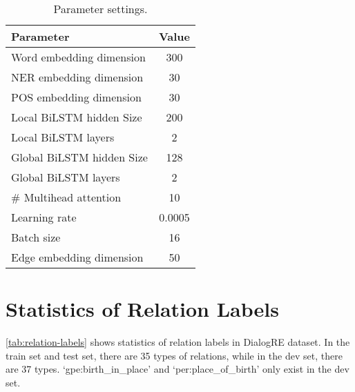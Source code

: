 \documentclass[11pt]{article}
\begin{document}
\begin{table}[ht]
\centering
\begin{tabular}{l|c}
\toprule
 Parameter & Value \\
\midrule
Word embedding dimension & 300 \\
NER embedding dimension & 30 \\
POS embedding dimension & 30 \\
Local BiLSTM hidden Size & 200 \\
Local BiLSTM layers & 2 \\
Global BiLSTM hidden Size & 128 \\
Global BiLSTM layers & 2 \\
\# Multihead attention & 10 \\
Learning rate & 0.0005 \\
Batch size & 16 \\
Edge embedding dimension & 50 \\
\bottomrule
\end{tabular}
\caption{Parameter settings.}
\label{tab:param_settings}
\end{table}

\section{Statistics of Relation Labels}
\label{sec:appendix2}
\cref{tab:relation-labels} shows statistics of relation labels in DialogRE dataset. In the train set and test set, there are 35 types of relations, while in the dev set, there are 37 types. `gpe:birth\_in\_place' and `per:place\_of\_birth' only exist in the dev set.
\end{document}
